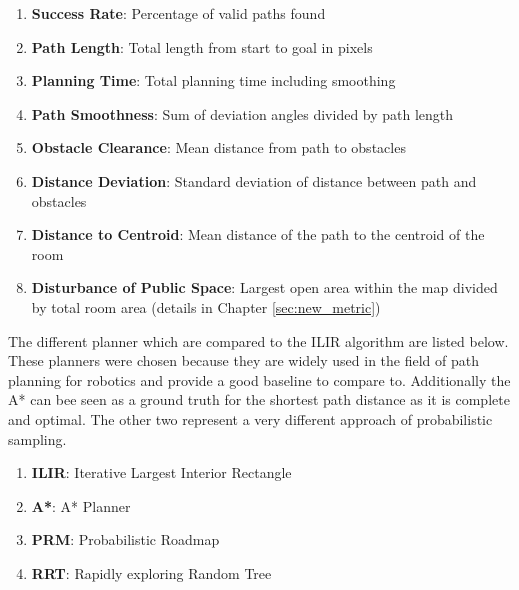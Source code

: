 \begin{enumerate}
    \item \textbf{Success Rate}: Percentage of valid paths found
    \item \textbf{Path Length}: Total length from start to goal in pixels
    \item \textbf{Planning Time}: Total planning time including smoothing
    \item \textbf{Path Smoothness}: Sum of deviation angles divided by path length
    \item \textbf{Obstacle Clearance}: Mean distance from path to obstacles
    \item \textbf{Distance Deviation}: Standard deviation of distance between path and obstacles
    \item \textbf{Distance to Centroid}: Mean distance of the path to the centroid of the room
    \item \textbf{Disturbance of Public Space}: Largest open area within the map divided by total room area (details in Chapter \ref{sec:new_metric})
\end{enumerate}

The different planner which are compared to the ILIR algorithm are listed below. These planners were chosen because they are widely used in the field of path planning for robotics and provide a good baseline to compare to. Additionally the A* can bee seen as a ground truth for the shortest path distance as it is complete and optimal. The other two represent a very different approach of probabilistic sampling.

\begin{enumerate}
    \item \textbf{ILIR}: Iterative Largest Interior Rectangle
    \item \textbf{A*}: A* Planner
    \item \textbf{PRM}: Probabilistic Roadmap
    \item \textbf{RRT}: Rapidly exploring Random Tree
\end{enumerate}

